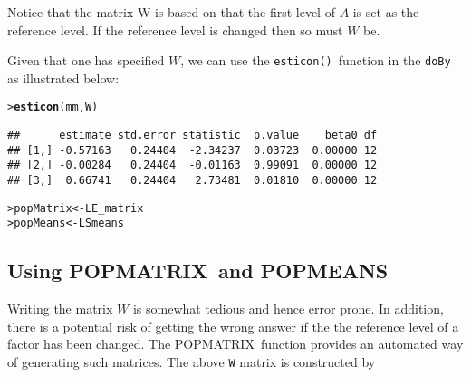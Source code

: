 \documentclass[11pt]{article}\usepackage[]{graphicx}\usepackage[]{color}
\makeatletter
\newcommand{\hlstd}[1]{\textcolor[rgb]{0.345,0.345,0.345}{#1}}%
\newcommand{\hlkwb}[1]{\textcolor[rgb]{0.69,0.353,0.396}{#1}}%
\newcommand{\hlkwd}[1]{\textcolor[rgb]{0.737,0.353,0.396}{\textbf{#1}}}%
\newenvironment{kframe}{%
 \def\at@end@of@kframe{}%
 \ifinner\ifhmode%
  \def\at@end@of@kframe{\end{minipage}}%
  \begin{minipage}{\columnwidth}%
 \fi\fi%
 \def\FrameCommand##1{\hskip\@totalleftmargin \hskip-\fboxsep
 \colorbox{shadecolor}{##1}\hskip-\fboxsep
     \hskip-\linewidth \hskip-\@totalleftmargin \hskip\columnwidth}%
 \MakeFramed {\advance\hsize-\width
   \@totalleftmargin\z@ \linewidth\hsize
   \@setminipage}}%
 {\par\unskip\endMakeFramed%
 \at@end@of@kframe}
\newenvironment{knitrout}{}{} %
\def\code#1{\texttt{#1}}
\def\esticon{\code{esticon()}}
\renewenvironment{knitrout}{
  \begin{oldknitrout}
    \footnotesize
    \topsep=0pt
}{
  \end{oldknitrout}
}
\makeatother
\begin{document}
Notice that the matrix W is based on that the first level of $A$ is
set as the reference level. If the reference level is changed then so
must $W$ be.


Given that one has specified $W$, we can use the \esticon\ function in the
\code{doBy} as illustrated below:

\begin{knitrout}
\color{fgcolor}\begin{kframe}
\begin{alltt}
\hlstd{> }\hlkwd{esticon}\hlstd{(mm, W)}
\end{alltt}
\begin{verbatim}
##      estimate std.error statistic  p.value    beta0 df
## [1,] -0.57163   0.24404  -2.34237  0.03723  0.00000 12
## [2,] -0.00284   0.24404  -0.01163  0.99091  0.00000 12
## [3,]  0.66741   0.24404   2.73481  0.01810  0.00000 12
\end{verbatim}
\end{kframe}
\end{knitrout}

\def\popmatrix{POPMATRIX}
\def\popmeans{POPMEANS}

\begin{knitrout}
\color{fgcolor}\begin{kframe}
\begin{alltt}
\hlstd{> }\hlstd{popMatrix} \hlkwb{<-} \hlstd{LE_matrix}
\hlstd{> }\hlstd{popMeans} \hlkwb{<-} \hlstd{LSmeans}
\end{alltt}
\end{kframe}
\end{knitrout}

\subsection{Using \popmatrix\  and \popmeans}
\label{sec:xxx}

Writing the matrix $W$ is somewhat tedious and hence error prone. In
addition, there is a potential risk of getting the wrong answer if the
the reference level of a factor has been changed.
The \popmatrix\ function provides an automated way of generating
such matrices.
The above \verb+W+ matrix is  constructed by
\end{document}

